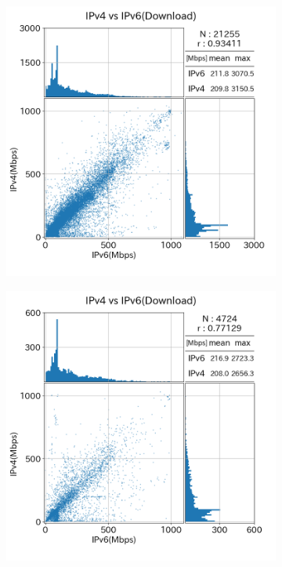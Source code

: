 \begin{figure}[htbp]
    \begin{center}
        \begin{subfigure}[b]{0.49\textwidth}
            \centering
            \includegraphics[width=1.0\textwidth]{fig/old_sameISP_dl.png}
            \label{old_sameISP_dl}
        \end{subfigure}
        \begin{subfigure}[b]{0.49\textwidth}
            \centering
            \includegraphics[width=1.0\textwidth]{fig/old_diffISP_dl.png}

\end{subfigure}
\end{center}
\end{figure}
